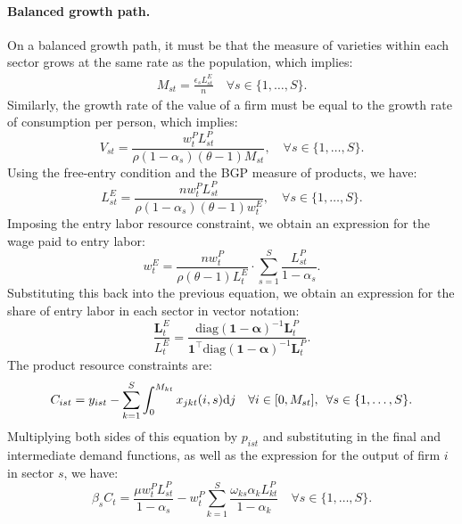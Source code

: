 \documentclass[12pt]{article}
\newcommand{\smallquad}{\hspace{0.5em}}
\begin{document}
\paragraph{Balanced growth path.} On a balanced growth path, it must be that the measure of varieties within each sector grows at the same rate as the population, which implies:
\begin{align*}
    M_{st} = \frac{\epsilon_s L_{st}^E}{n} \quad \forall s \in \{1, \ldots, S\}.
\end{align*}
Similarly, the growth rate of the value of a firm must be equal to the growth rate of consumption per person, which implies:
\begin{equation*}
    V_{st} = \frac{w_t^P L_{st}^P}{\rho (1 - \alpha_s) (\theta - 1) M_{st}}, \quad \forall s \in \{1, \ldots, S\}.
\end{equation*}
Using the free-entry condition and the BGP measure of products, we have:
\begin{equation*}
    L_{st}^E = \frac{n w_t^P L_{st}^P}{\rho (1 - \alpha_s) (\theta - 1) w_t^E}, \quad \forall s \in \{1, \ldots, S\}.
\end{equation*}
Imposing the entry labor resource constraint, we obtain an expression for the wage paid to entry labor:
\begin{equation*}
    w_t^E = \frac{n w_t^P}{\rho (\theta - 1) L_t^E} \cdot \sum_{s = 1}^S \frac{L_{st}^P}{1 - \alpha_s}.
\end{equation*}
Substituting this back into the previous equation, we obtain an expression for the share of entry labor in each sector in vector notation:
\begin{equation*}
    \frac{\mathbf{L}_t^E}{L_t^E} = \frac{\text{diag}(\mathbf{1} - \bm{\alpha})^{-1} \mathbf{L}_t^P}{\mathbf{1}^{\top} \text{diag}(\mathbf{1} - \bm{\alpha})^{-1} \mathbf{L}_t^P}.
\end{equation*}
The product resource constraints are:
\begin{equation*}
    C_{ist} = y_{ist} - \sum_{k = 1}^S \int_0^{M_{kt}} x_{jkt}(i, s) \text{d}j \quad \forall i \in [0, M_{st}], \smallquad \forall s \in \{1, \ldots, S\}.
\end{equation*}
Multiplying both sides of this equation by $p_{ist}$ and substituting in the final and intermediate demand functions, as well as the expression for the output of firm $i$ in sector $s$, we have:
\begin{equation*}
    \beta_s C_t = \frac{\mu w_t^P L_{st}^P}{1 - \alpha_s} - w_t^P \sum_{k = 1}^S \frac{\omega_{ks} \alpha_k L_{kt}^P}{1 - \alpha_k} \quad \forall s \in \{1, \ldots, S\}.
\end{equation*}
\end{document}
